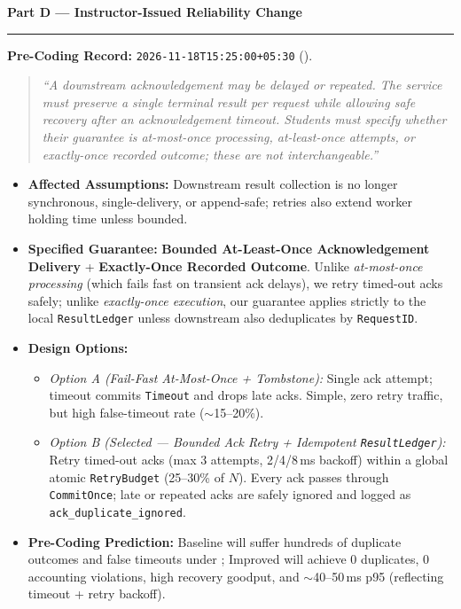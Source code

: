 \documentclass[11pt]{article}
\newcommand{\partheader}[1]{%
    \vspace{1.0em}%
    {\noindent\fontsize{13.5}{16}\selectfont\textbf{\color{accentblue}#1}\par}%
    \vspace{0.2em}\hrule\vspace{0.7em}%
}
\begin{document}
\newpage
\partheader{Part D --- Instructor-Issued Reliability Change}

\textbf{Pre-Coding Record:} \texttt{2026-11-18T15:25:00+05:30} ().

\begin{quote}
\itshape ``A downstream acknowledgement may be delayed or repeated. The service must preserve a single terminal result per request while allowing safe recovery after an acknowledgement timeout. Students must specify whether their guarantee is at-most-once processing, at-least-once attempts, or exactly-once recorded outcome; these are not interchangeable.''
\end{quote}

\begin{itemize}
    \item \textbf{Affected Assumptions:} Downstream result collection is no longer synchronous, single-delivery, or append-safe; retries also extend worker holding time unless bounded.
    \item \textbf{Specified Guarantee:} \textbf{Bounded At-Least-Once Acknowledgement Delivery} + \textbf{Exactly-Once Recorded Outcome}. Unlike \textit{at-most-once processing} (which fails fast on transient ack delays), we retry timed-out acks safely; unlike \textit{exactly-once execution}, our guarantee applies strictly to the local \texttt{ResultLedger} unless downstream also deduplicates by \texttt{RequestID}.
    \item \textbf{Design Options:}
    \begin{itemize}
        \item \textit{Option A (Fail-Fast At-Most-Once + Tombstone):} Single ack attempt; timeout commits \texttt{Timeout} and drops late acks. Simple, zero retry traffic, but high false-timeout rate ($\sim$15--20\%).
        \item \textit{Option B (Selected --- Bounded Ack Retry + Idempotent \texttt{ResultLedger}):} Retry timed-out acks (max 3 attempts, 2/4/8\,ms backoff) within a global atomic \texttt{RetryBudget} (25--30\% of $N$). Every ack passes through \texttt{CommitOnce}; late or repeated acks are safely ignored and logged as \texttt{ack\_duplicate\_ignored}.
    \end{itemize}
    \item \textbf{Pre-Coding Prediction:} Baseline will suffer hundreds of duplicate outcomes and false timeouts under ; Improved will achieve 0 duplicates, 0 accounting violations, high recovery goodput, and $\sim$40--50\,ms p95 (reflecting timeout + retry backoff).
\end{itemize}
\end{document}
